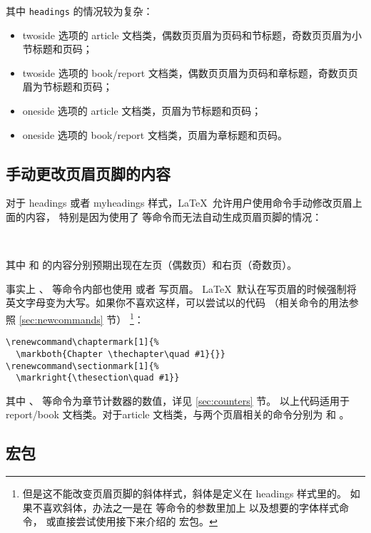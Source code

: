 其中 \texttt{headings} 的情况较为复杂：
\begin{itemize}
  \item twoside 选项的 article 文档类，偶数页页眉为页码和节标题，奇数页页眉为小节标题和页码；
  \item twoside 选项的 book/report 文档类，偶数页页眉为页码和章标题，奇数页页眉为节标题和页码；
  \item oneside 选项的 article 文档类，页眉为节标题和页码；
  \item oneside 选项的 book/report 文档类，页眉为章标题和页码。
\end{itemize}

\subsection{手动更改页眉页脚的内容}\label{subsec:marks}

对于 headings 或者 myheadings 样式，\LaTeX\ 允许用户使用命令手动修改页眉上面的内容，
特别是因为使用了  等命令而无法自动生成页眉页脚的情况：
\begin{command}
\\
\end{command}

其中  和  的内容分别预期出现在左页（偶数页）和右页（奇数页）。

事实上 、 等命令内部也使用  或者  写页眉。
\LaTeX\ 默认在写页眉的时候强制将英文字母变为大写。如果你不喜欢这样，可以尝试以的代码
（相关命令的用法参照 \ref{sec:newcommands} 节）%
\footnote{但是这不能改变页眉页脚的斜体样式，斜体是定义在 headings 样式里的。
如果不喜欢斜体，办法之一是在  等命令的参数里加上  以及想要的字体样式命令，
或直接尝试使用接下来介绍的  宏包。}：
\begin{verbatim}
\renewcommand\chaptermark[1]{%
  \markboth{Chapter \thechapter\quad #1}{}}
\renewcommand\sectionmark[1]{%
  \markright{\thesection\quad #1}}
\end{verbatim}

其中 、 等命令为章节计数器的数值，详见 \ref{sec:counters} 节。
以上代码适用于 report/book 文档类。对于article 文档类，与两个页眉相关的命令分别为  和  。

\subsection{ 宏包}\label{subsec:fancyhdr}

